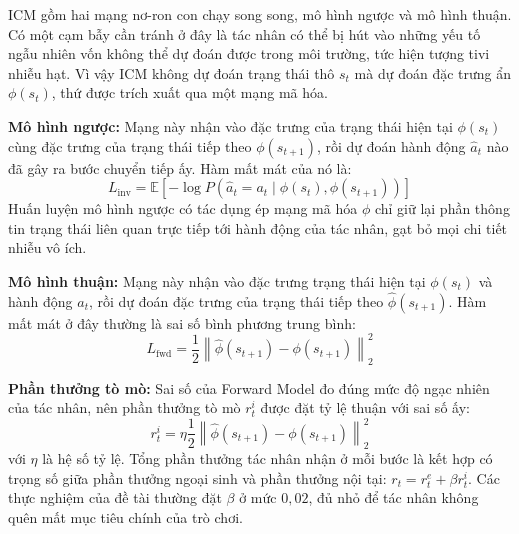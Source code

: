 \indent ICM gồm hai mạng nơ-ron con chạy song song, mô hình ngược và mô
hình thuận. Có một cạm bẫy cần tránh ở đây là tác nhân có thể bị hút vào
những yếu tố ngẫu nhiên vốn không thể dự đoán được trong môi trường, tức hiện tượng tivi
nhiễu hạt. Vì vậy ICM không dự đoán trạng thái thô $s_t$ mà dự đoán
đặc trưng ẩn $\phi(s_t)$, thứ được trích xuất qua một mạng mã hóa.

\indent \textbf{Mô hình ngược:} Mạng này nhận vào đặc trưng của trạng thái
hiện tại $\phi(s_t)$ cùng đặc trưng của trạng thái tiếp theo $\phi(s_{t+1})$, rồi dự đoán
hành động $\hat{a}_t$ nào đã gây ra bước chuyển tiếp ấy. Hàm mất mát của nó là:
\begin{equation}
    L_{\text{inv}} = \mathbb{E} \left[ -\log P(\hat{a}_t = a_t \mid \phi(s_t), \phi(s_{t+1})) \right]
\end{equation}
Huấn luyện mô hình ngược có tác dụng ép mạng mã hóa $\phi$ chỉ giữ lại phần thông tin
trạng thái liên quan trực tiếp tới hành động của tác nhân, gạt bỏ mọi chi tiết nhiễu vô
ích.

\indent \textbf{Mô hình thuận:} Mạng này nhận vào đặc trưng trạng thái
hiện tại $\phi(s_t)$ và hành động $a_t$, rồi dự đoán đặc trưng của trạng thái tiếp theo
$\hat{\phi}(s_{t+1})$. Hàm mất mát ở đây thường là sai số bình phương trung bình:
\begin{equation}
    L_{\text{fwd}} = \frac{1}{2} \left\| \hat{\phi}(s_{t+1}) - \phi(s_{t+1}) \right\|^2_2
\end{equation}

\indent \textbf{Phần thưởng tò mò:} Sai số của Forward Model đo đúng mức độ ngạc nhiên
của tác nhân, nên phần thưởng tò mò $r_t^i$ được đặt tỷ lệ thuận với sai số ấy:
\begin{equation}
    r_t^i = \eta \frac{1}{2} \left\| \hat{\phi}(s_{t+1}) - \phi(s_{t+1}) \right\|^2_2
\end{equation}
\noindent với $\eta$ là hệ số tỷ lệ. Tổng phần thưởng tác nhân nhận ở mỗi bước là kết hợp
có trọng số giữa phần thưởng ngoại sinh và phần thưởng nội tại: $r_t = r_t^e + \beta
r_t^i$. Các thực nghiệm của đề tài thường đặt $\beta$ ở mức $0{,}02$, đủ nhỏ để tác nhân
không quên mất mục tiêu chính của trò chơi.

